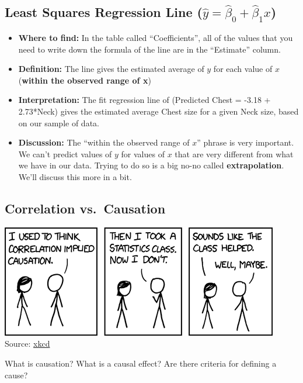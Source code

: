 \documentclass[
]{book}
\providecommand{\tightlist}{%
  \setlength{\itemsep}{0pt}\setlength{\parskip}{0pt}}
\begin{document}
\subsection{\texorpdfstring{Least Squares Regression Line (\(\hat{y} = \hat{\beta}_0 + \hat{\beta}_1x\))}{Least Squares Regression Line (\textbackslash hat\{y\} = \textbackslash hat\{\textbackslash beta\}\_0 + \textbackslash hat\{\textbackslash beta\}\_1x)}}\label{least-squares-regression-line-haty-hatbeta_0-hatbeta_1x}

\begin{itemize}
\tightlist
\item
  \textbf{Where to find:} In the table called ``Coefficients'', all of the values that you need to write down the formula of the line are in the ``Estimate'' column.
\item
  \textbf{Definition:} The line gives the estimated average of \(y\) for each value of \(x\) (\textbf{within the observed range of x})
\item
  \textbf{Interpretation:} The fit regression line of (Predicted Chest = -3.18 + 2.73*Neck) gives the estimated average Chest size for a given Neck size, based on our sample of data.
\item
  \textbf{Discussion:} The ``within the observed range of \(x\)'' phrase is very important. We can't predict values of \(y\) for values of \(x\) that are very different from what we have in our data. Trying to do so is a big no-no called \textbf{extrapolation}. We'll discuss this more in a bit.
\end{itemize}

\subsection{Correlation vs.~Causation}\label{correlation-vs.-causation}

\includegraphics{Photos/correlation.png}
Source: \href{https://xkcd.com/552/}{xkcd}

What is causation? What is a causal effect? Are there criteria for defining a cause?
\end{document}
